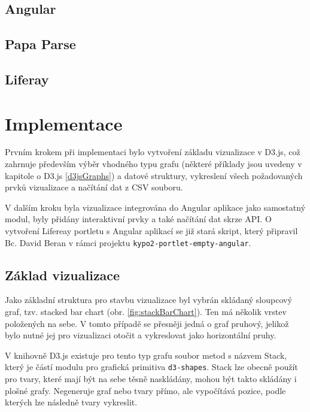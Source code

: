 \documentclass[
  digital, %
  oneside, %
  table,   %
  nolof,     %
  nolot,     %
]{fithesis3}
\begin{document}
\section{Angular}
\section{Papa Parse}
\section{Liferay} \label{liferay}

\chapter{Implementace}
Prvním krokem při implementaci bylo vytvoření základu vizualizace v D3.js, což zahrnuje především výběr vhodného typu grafu (některé příklady jsou uvedeny v kapitole o D3.js \ref{d3jsGraphs}) a datové struktury, vykreslení všech požadovaných prvků vizualizace a načítání dat z CSV souboru.\par
V dalším kroku byla vizualizace integrována do Angular aplikace jako samostatný modul, byly přidány interaktivní prvky a také načítání dat skrze API. O vytvoření Lifereay portletu s Angular aplikací se již stará skript, který připravil Bc. David Beran v rámci projektu \verb|kypo2-portlet-empty-angular|.

\section{Základ vizualizace}
Jako základní struktura pro stavbu vizualizace byl vybrán skládaný sloupcový graf, tzv. stacked bar chart (obr. \ref{fig:stackBarChart}). Ten má několik vrstev položených na sebe. V tomto případě se přesněji jedná o graf pruhový, jelikož bylo nutné jej pro vizualizaci otočit a vykreslovat jako horizontální pruhy.\par
V knihovně D3.js existuje pro tento typ grafu soubor metod s názvem Stack, který je částí modulu pro grafická primitiva \verb|d3-shapes|. Stack lze obecně použít pro tvary, které mají být na sebe těsně naskládány, mohou být takto skládány i plošné grafy. Negeneruje graf nebo tvary přímo, ale vypočítává pozice, podle kterých lze následně tvary vykreslit. \cite{d3jsorg}\par
\end{document}

